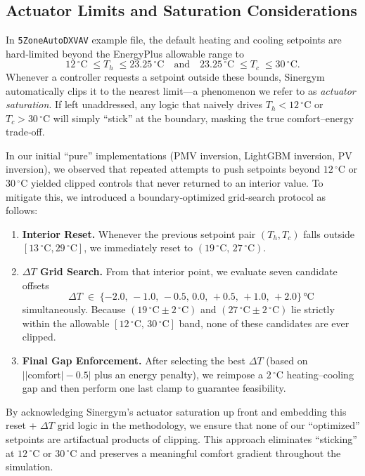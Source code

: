 \subsection{Actuator Limits and Saturation Considerations}
\label{sec:actuator_saturation_method}

In \texttt{5ZoneAutoDXVAV} example file, the default heating and cooling setpoints are hard‐limited beyond the EnergyPlus allowable range to
\[
12\,^\circ\mathrm{C} \;\leq T_{h} \;\leq 23.25\,^\circ\mathrm{C} 
\quad\text{and}\quad
23.25\,^\circ\mathrm{C} \;\leq T_{c} \;\leq 30\,^\circ\mathrm{C}.
\]
Whenever a controller requests a setpoint outside these bounds, Sinergym automatically clips it to the nearest limit—a phenomenon we refer to as \emph{actuator saturation}. If left unaddressed, any logic that naively drives $T_{h}<12\,^\circ\mathrm{C}$ or $T_{c}>30\,^\circ\mathrm{C}$ will simply “stick” at the boundary, masking the true comfort–energy trade‐off.

In our initial “pure” implementations (PMV inversion, LightGBM inversion, PV inversion), we observed that repeated attempts to push setpoints beyond $12\,^\circ\mathrm{C}$ or $30\,^\circ\mathrm{C}$ yielded clipped controls that never returned to an interior value. To mitigate this, we introduced a boundary‐optimized grid‐search protocol as follows:  
\begin{enumerate}
  \item \textbf{Interior Reset.} Whenever the previous setpoint pair $(T_{h},T_{c})$ falls outside $[13\,^\circ\mathrm{C},29\,^\circ\mathrm{C}]$, we immediately reset to $(19\,^\circ\mathrm{C},\,27\,^\circ\mathrm{C})$.  
  \item \textbf{$\Delta T$ Grid Search.} From that interior point, we evaluate seven candidate offsets
    \[
      \Delta T \;\in\; \{-2.0,\,-1.0,\,-0.5,\,0.0,\,+0.5,\,+1.0,\,+2.0\}\,\text{°C}
    \]
    simultaneously. Because $(19\,^\circ\mathrm{C} \pm 2\,^\circ\mathrm{C})$ and $(27\,^\circ\mathrm{C} \pm 2\,^\circ\mathrm{C})$ lie strictly within the allowable $[12\,^\circ\mathrm{C},\,30\,^\circ\mathrm{C}]$ band, none of these candidates are ever clipped.  
  \item \textbf{Final Gap Enforcement.} After selecting the best $\Delta T$ (based on $\bigl|\lvert \text{comfort}\rvert - 0.5\bigr|$ plus an energy penalty), we reimpose a $2\,^\circ\mathrm{C}$ heating–cooling gap and then perform one last clamp to guarantee feasibility.  
\end{enumerate}

By acknowledging Sinergym’s actuator saturation up front and embedding this reset + $\Delta T$ grid logic in the methodology, we ensure that none of our “optimized” setpoints are artifactual products of clipping. This approach eliminates “sticking” at $12\,^\circ\mathrm{C}$ or $30\,^\circ\mathrm{C}$ and preserves a meaningful comfort gradient throughout the simulation.